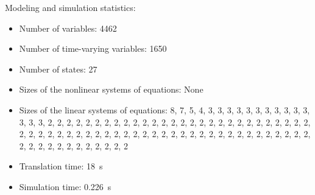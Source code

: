 \begin{contextbox}
  Modeling and simulation statistics:
  \begin{itemize}
    \item Number of variables: 4462
    \item Number of time-varying variables: 1650
    \item Number of states: 27
    \item Sizes of the nonlinear systems of equations: None
    \item Sizes of the linear systems of equations: 8, 7, 5, 4, 3, 3, 3, 3, 3, 3, 3, 3, 3, 3, 3, 3, 3, 3, 2, 2, 2, 2, 2, 2, 2, 2, 2, 2, 2, 2, 2, 2, 2, 2, 2, 2, 2, 2, 2, 2, 2, 2, 2, 2, 2, 2, 2, 2, 2, 2, 2, 2, 2, 2, 2, 2, 2, 2, 2, 2, 2, 2, 2, 2, 2, 2, 2, 2, 2, 2, 2, 2, 2, 2, 2, 2, 2, 2, 2, 2, 2, 2, 2, 2, 2, 2, 2, 2, 2
    \item Translation time: \SI{18}{s}
    \item Simulation time: \SI{0.226}{s}
  \end{itemize}
\end{contextbox}